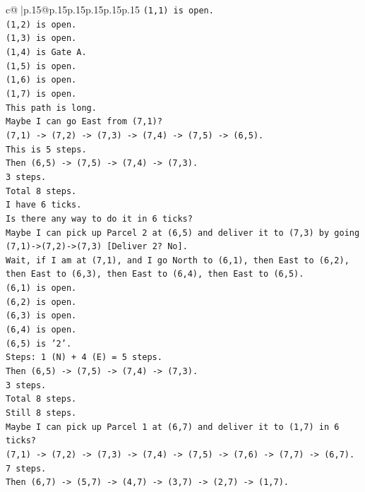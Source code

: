 \documentclass{article}
\begin{document}
{\begin{supertabular}{c@{$\;$}|p{.15\linewidth}@{}p{.15\linewidth}p{.15\linewidth}p{.15\linewidth}p{.15\linewidth}p{.15\linewidth}}
{{{\texttt{(1,1) is open.} \\
\texttt{(1,2) is open.} \\
\texttt{(1,3) is open.} \\
\texttt{(1,4) is Gate A.} \\
\texttt{(1,5) is open.} \\
\texttt{(1,6) is open.} \\
\texttt{(1,7) is open.} \\
\texttt{This path is long.} \\
\texttt{Maybe I can go East from (7,1)?} \\
\texttt{(7,1) {-}> (7,2) {-}> (7,3) {-}> (7,4) {-}> (7,5) {-}> (6,5).} \\
\texttt{This is 5 steps.} \\
\texttt{Then (6,5) {-}> (7,5) {-}> (7,4) {-}> (7,3).} \\
\texttt{3 steps.} \\
\texttt{Total 8 steps.} \\
\texttt{I have 6 ticks.} \\
\texttt{Is there any way to do it in 6 ticks?} \\
\texttt{Maybe I can pick up Parcel 2 at (6,5) and deliver it to (7,3) by going (7,1){-}>(7,2){-}>(7,3) {[}Deliver 2? No{]}.} \\
\texttt{Wait, if I am at (7,1), and I go North to (6,1), then East to (6,2), then East to (6,3), then East to (6,4), then East to (6,5).} \\
\texttt{(6,1) is open.} \\
\texttt{(6,2) is open.} \\
\texttt{(6,3) is open.} \\
\texttt{(6,4) is open.} \\
\texttt{(6,5) is '2'.} \\
\texttt{Steps: 1 (N) + 4 (E) = 5 steps.} \\
\texttt{Then (6,5) {-}> (7,5) {-}> (7,4) {-}> (7,3).} \\
\texttt{3 steps.} \\
\texttt{Total 8 steps.} \\
\texttt{Still 8 steps.} \\
\texttt{Maybe I can pick up Parcel 1 at (6,7) and deliver it to (1,7) in 6 ticks?} \\
\texttt{(7,1) {-}> (7,2) {-}> (7,3) {-}> (7,4) {-}> (7,5) {-}> (7,6) {-}> (7,7) {-}> (6,7).} \\
\texttt{7 steps.} \\
\texttt{Then (6,7) {-}> (5,7) {-}> (4,7) {-}> (3,7) {-}> (2,7) {-}> (1,7).} \\
}}}
\end{supertabular}}
\end{document}
